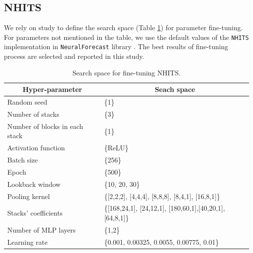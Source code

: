\documentclass[a4paper,fleqn]{cas-sc}
\begin{document}
\subsection{NHITS}

We rely on study \cite{challu2023nhits} to define the search space (Table \ref{tab:nhits_finetune}) for parameter fine-tuning. For parameters not mentioned in the table, we use the default values of the \verb|NHITS| implementation in \verb|NeuralForecast| library \cite{neuralforecast}. The best results of fine-tuning process are selected and reported in this study.

\begin{table}[H]
    \centering
    \caption{Search space for fine-tuning NHITS.}
    \label{tab:nhits_finetune}
    \begin{tabular}{ll} 
        \toprule
        \multicolumn{1}{c}{Hyper-parameter} & \multicolumn{1}{c}{Seach space}                              \\ 
        \hline
        Random seed                         & \{1\}                                                        \\
        Number of stacks                    & \{3\}                                                        \\
        Number of blocks in each stack      & \{1\}                                                        \\
        Activation function                 & \{ReLU\}                                                     \\
        Batch size                          & \{256\}                                                      \\
        Epoch                               & \{500\}                                                      \\ 
        \hline
        Lookback window                     & \{10, 20, 30\}                                                \\
        Pooling kernel                      & \{[2,2,2], [4,4,4], [8,8,8], [8,4,1], [16,8,1]\}           \\
        Stacks' coefficients                & \{[168,24,1], [24,12,1], [180,60,1],[40,20,1], [64,8,1]\}  \\
        Number of MLP layers                & \{1,2\}                                                      \\
        Learning rate                       & \{0.001, 0.00325, 0.0055, 0.00775, 0.01\}                          \\
        \bottomrule
        \end{tabular}
\end{table}
\end{document}
